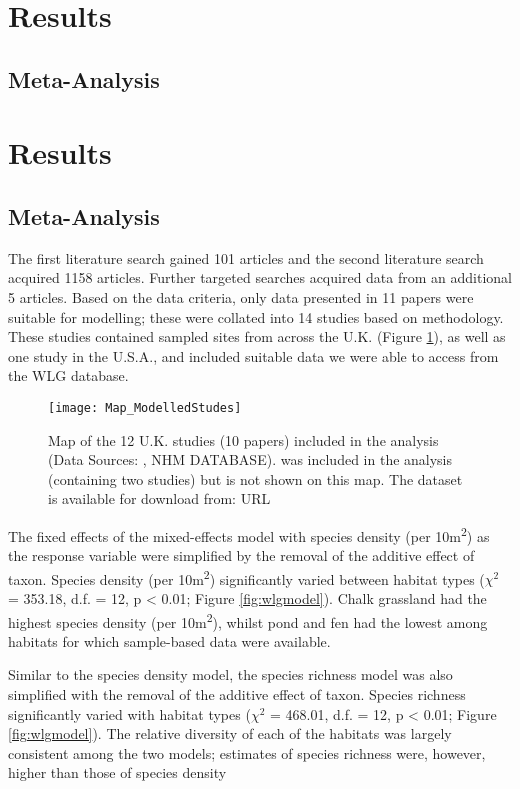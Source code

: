 \ifappendixStyle %
\section{Results}
\subsection{Meta-Analysis}%
\else
\section*{Results}
\subsection*{Meta-Analysis}
\fi

The first literature search gained 101 articles and the second literature search acquired 1158 articles.  Further targeted searches acquired data from an additional 5 articles. Based on the data criteria, only data presented in 11 papers were suitable for modelling; these were collated into 14 studies based on methodology.  These studies contained sampled sites from across the U.K. (Figure \ref{fig:wlgmap}), as well as one study in the U.S.A., and included suitable data we were able to access from the WLG database.

\begin{figure}[t]
	\centering
	\texttt{[image: Map\_ModelledStudes]}
	\caption{Map of the 12 U.K. studies (10 papers) included in the analysis (Data Sources: \cite{Petit:1998bc,Wilson:2003aee,Fountain:2004et,Smith:2006ue,Butt:2008ejsb,Williams:2008hb,Scriven:2013ije,Sirohi:2015jic,Speak:2015ufug}, NHM DATABASE). \cite{Macivor:2011ue} was included in the analysis (containing two studies) but is not shown on this map. The dataset is available for download from: URL}
   	 \label{fig:wlgmap}
\end{figure}

The fixed effects of the mixed-effects model with species density (per 10m\textsuperscript{2}) as the response variable were simplified by the removal of the additive effect of taxon. Species density (per 10m\textsuperscript{2}) significantly varied between habitat types ($\chi^2$ = 353.18, d.f. = 12, p < 0.01; Figure \ref{fig:wlgmodel}). Chalk grassland had the highest species density (per 10m\textsuperscript{2}), whilst pond and fen had the lowest among habitats for which sample-based data were available. 

Similar to the species density model, the species richness model was also simplified with the removal of the additive effect of taxon.  Species richness significantly varied with habitat types ($\chi^2$ = 468.01, d.f. = 12, p < 0.01; Figure \ref{fig:wlgmodel}).  The relative diversity of each of the habitats was largely consistent among the two models; estimates of species richness were, however, higher than those of species density
 	 
